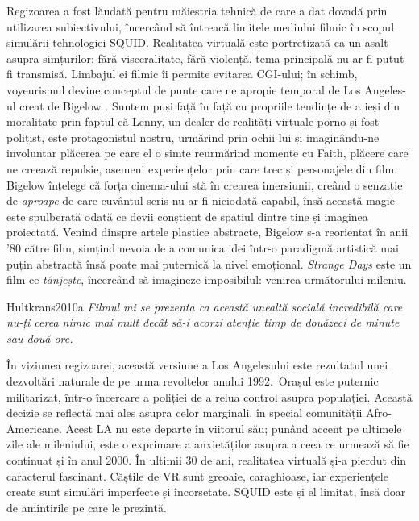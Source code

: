 \documentclass[12pt]{article}
\begin{document}
{Regizoarea a fost lăudată pentru măiestria tehnică de care a dat dovadă prin utilizarea subiectivului, încercând să întreacă limitele mediului filmic în scopul simulării tehnologiei SQUID. Realitatea virtuală este portretizată ca un asalt asupra simțurilor; fără visceralitate, fără violență, tema principală nu ar fi putut fi transmisă. Limbajul ei filmic îi permite evitarea CGI-ului; în schimb, voyeurismul devine conceptul de punte care ne apropie temporal de Los Angeles-ul creat de Bigelow \cite{Hultkrans2010a}. Suntem puși față în față cu propriile tendințe de a ieși din moralitate prin faptul că Lenny, un dealer de realități virtuale porno și fost polițist, este protagonistul nostru, urmărind prin ochii lui și imaginându-ne involuntar plăcerea pe care el o simte reurmărind momente cu Faith, plăcere care ne creează repulsie, asemeni experiențelor prin care trec și personajele din film. Bigelow înțelege că forța cinema-ului stă în crearea imersiunii, creând o senzație de \textit{aproape} de care cuvântul scris nu ar fi niciodată capabil, însă această magie este spulberată odată ce devii conștient de spațiul dintre tine și imaginea proiectată. Venind dinspre artele plastice abstracte, Bigelow s-a reorientat în anii '80 către film, simțind nevoia de a comunica idei într-o paradigmă artistică mai puțin abstractă însă poate mai puternică la nivel emoțional. \textit{Strange Days} este un film ce \textit{tânjește}, încercând să imagineze imposibilul: venirea următorului mileniu.\par

\begin{displaycquote}{Hultkrans2010a}
	\textit{Filmul mi se prezenta ca această unealtă socială incredibilă care nu-ți cerea nimic mai mult decât să-i acorzi atenție timp de douăzeci de minute sau două ore.}
\end{displaycquote}

În viziunea regizoarei, această versiune a Los Angelesului este rezultatul unei dezvoltări naturale de pe urma revoltelor anului 1992. Orașul este puternic militarizat, într-o încercare a poliției de a relua control asupra populației. Această decizie se reflectă mai ales asupra celor marginali, în special comunității Afro-Americane. Acest LA nu este departe în viitorul său; punând accent pe ultimele zile ale mileniului, este o exprimare a anxietăților asupra a ceea ce urmează să fie continuat și în anul 2000. În ultimii 30 de ani, realitatea virtuală și-a pierdut din caracterul fascinant. Căștile de VR sunt greoaie, caraghioase, iar experiențele create sunt simulări imperfecte și încorsetate. SQUID este și el limitat, însă doar de amintirile pe care le prezintă.\par

}
\end{document}

